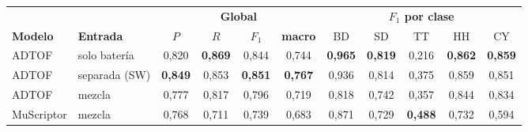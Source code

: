 \begin{tabular}{llcccc|ccccc}
\toprule
& & \multicolumn{4}{c|}{\textbf{Global}} & \multicolumn{5}{c}{\textbf{$F_1$ por clase}} \\
\textbf{Modelo} & \textbf{Entrada} & $P$ & $R$ & $F_1$ & \textbf{macro} & BD & SD & TT & HH & CY \\
\midrule
ADTOF & solo batería & 0{,}820 & \textbf{0{,}869} & 0{,}844 & 0{,}744 & \textbf{0{,}965} & \textbf{0{,}819} & 0{,}216 & \textbf{0{,}862} & \textbf{0{,}859} \\
ADTOF & separada (SW) & \textbf{0{,}849} & 0{,}853 & \textbf{0{,}851} & \textbf{0{,}767} & 0{,}936 & 0{,}814 & 0{,}375 & 0{,}859 & 0{,}851 \\
ADTOF & mezcla & 0{,}777 & 0{,}817 & 0{,}796 & 0{,}719 & 0{,}818 & 0{,}742 & 0{,}357 & 0{,}844 & 0{,}834 \\
MuScriptor & mezcla & 0{,}768 & 0{,}711 & 0{,}739 & 0{,}683 & 0{,}871 & 0{,}729 & \textbf{0{,}488} & 0{,}732 & 0{,}594 \\
\bottomrule
\end{tabular}
